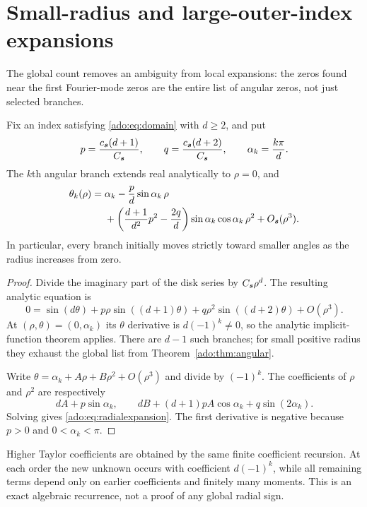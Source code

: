 \section{Small-radius and large-outer-index expansions}
\label{ado:sec:asymptotics}
The global count removes an ambiguity from local expansions: the zeros
found near the first Fourier-mode zeros are the entire list of angular
zeros, not just selected branches.

\begin{theorem}
\label{ado:thm:radialexpansion}
Fix an index satisfying \eqref{ado:eq:domain} with $d\ge2$, and put
\[
 p=\frac{c_{\boldsymbol{s}}(d+1)}{C_{\boldsymbol{s}}},\qquad
 q=\frac{c_{\boldsymbol{s}}(d+2)}{C_{\boldsymbol{s}}},\qquad
 \alpha_k=\frac{k\pi}{d}.
\]
The $k$th angular branch extends real analytically to $\rho=0$, and
\begin{align}
 \theta_k(\rho)={}&\alpha_k
 -\frac{p}{d}\sin\alpha_k\,\rho \notag\\
 &+\left(\frac{d+1}{d^2}p^2-\frac{2q}{d}\right)
       \sin\alpha_k\cos\alpha_k\,\rho^2
 +O_{\boldsymbol{s}}(\rho^3).
 \label{ado:eq:radialexpansion}
\end{align}
In particular, every branch initially moves strictly toward smaller
angles as the radius increases from zero.
\end{theorem}
\begin{proof}
Divide the imaginary part of the disk series by $C_{\boldsymbol{s}}\rho^d$.
The resulting analytic equation is
\[
 0=\sin(d\theta)+p\rho\sin((d+1)\theta)
                   +q\rho^2\sin((d+2)\theta)+O(\rho^3).
\]
At $(\rho,\theta)=(0,\alpha_k)$ its $\theta$ derivative is
$d(-1)^k\ne0$, so the analytic implicit-function theorem applies.
There are $d-1$ such branches; for small positive radius they exhaust
the global list from Theorem~\ref{ado:thm:angular}.

Write $\theta=\alpha_k+A\rho+B\rho^2+O(\rho^3)$ and divide by
$(-1)^k$. The coefficients of $\rho$ and $\rho^2$ are respectively
\[
 dA+p\sin\alpha_k,
 \qquad dB+(d+1)pA\cos\alpha_k+q\sin(2\alpha_k).
\]
Solving gives \eqref{ado:eq:radialexpansion}. The first derivative is
negative because $p>0$ and $0<\alpha_k<\pi$.
\end{proof}
Higher Taylor coefficients are obtained by the same finite coefficient
recursion. At each order the new unknown occurs with coefficient
$d(-1)^k$, while all remaining terms depend only on earlier
coefficients and finitely many moments. This is an exact algebraic
recurrence, not a proof of any global radial sign.

